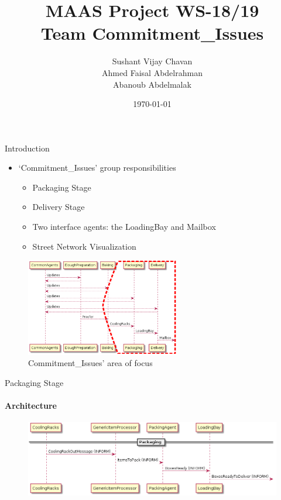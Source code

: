 \documentclass[9pt]{beamer}
\title{MAAS Project WS-18/19 \\ Team Commitment\_Issues}
\author{Sushant Vijay Chavan\\Ahmed Faisal Abdelrahman\\Abanoub Abdelmalak}
\date{\today}
\let\olditem=\item%
\renewcommand{\item}{\olditem \justifying}%
\begin{document}
\maketitle

\begin{frame}{Introduction}
	\begin{itemize}
		\item `Commitment\_Issues' group responsibilities
		\begin{itemize}
			\item Packaging Stage
			\item Delivery Stage
			\item Two interface agents: the LoadingBay and Mailbox
			\item Street Network Visualization
		\end{itemize}
	\end{itemize}
	
	\begin{figure}[h!]
	\centering
	\includegraphics[width=0.6\textwidth]{Architecture_Stages.png}
	\caption{Commitment\_Issues' area of focus}
\end{figure}
\end{frame}

\begin{frame}{Packaging Stage}
\framesubtitle{Architecture}
\begin{figure}[h!]
	\centering
	\includegraphics[width=\textwidth]{../Architecture/Architecture_Packaging.png}
\end{figure}
\end{frame}
\end{document}
